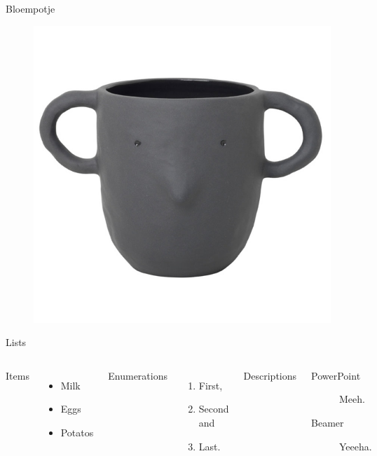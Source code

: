 \documentclass[10pt]{beamer}
\begin{document}
\begin{frame}{Bloempotje}
    \begin{figure}
        \centering
        \includegraphics[scale=0.2]{bloempotje.jpg}
        \caption{}
        \label{fig:my_label}
    \end{figure}
\end{frame}






\begin{frame}{Lists}
  \begin{columns}[T,onlytextwidth]
      Items
      \begin{itemize}
        \item Milk \item Eggs \item Potatos
      \end{itemize}

      Enumerations
      \begin{enumerate}
        \item First, \item Second and \item Last.
      \end{enumerate}

      Descriptions
      \begin{description}
        \item[PowerPoint] Meeh. \item[Beamer] Yeeeha.
      \end{description}
  \end{columns}
\end{frame}
\end{document}
